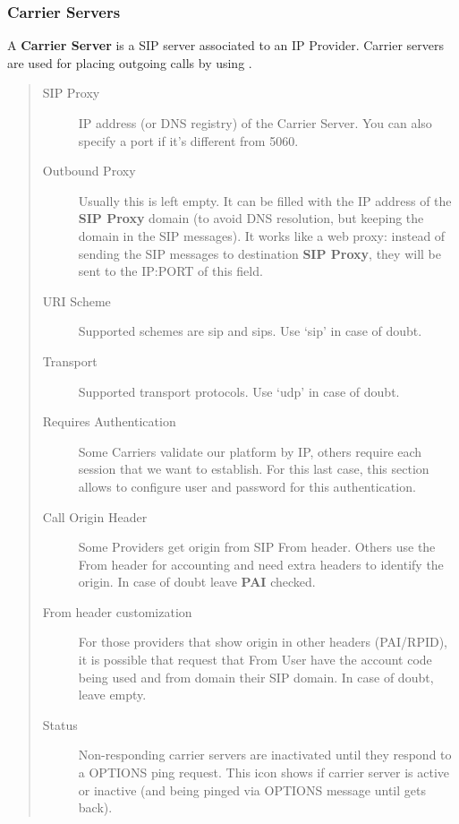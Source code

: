 \documentclass[letterpaper,10pt,english]{sphinxmanual}
\begin{document}
\subsubsection{Carrier Servers}
\label{administration_portal/brand/providers/carriers:carrier-servers}
A \textbf{Carrier Server} is a SIP server associated to an IP Provider. Carrier servers
are used for placing outgoing calls by using {\hyperref[administration_portal/brand/routing/outgoing_routings:outgoing\string-routings]{}}.
\begin{quote}
\begin{description}
\item[{SIP Proxy}] \leavevmode
IP address (or DNS registry) of the Carrier Server. You can also specify
a port if it's different from 5060.

\item[{Outbound Proxy}] \leavevmode
Usually this is left empty. It can be filled with the IP address of the
\textbf{SIP Proxy} domain (to avoid DNS resolution, but keeping the domain
in the SIP messages). It works like a web proxy: instead of sending the
SIP messages to destination \textbf{SIP Proxy}, they will be sent to the
IP:PORT of this field.

\item[{URI Scheme}] \leavevmode
Supported schemes are sip and sips. Use `sip' in case of doubt.

\item[{Transport}] \leavevmode
Supported transport protocols. Use `udp' in case of doubt.

\item[{Requires Authentication}] \leavevmode
Some Carriers validate our platform by IP, others require
each session that we want to establish. For this last case, this section
allows to configure user and password for this authentication.

\item[{Call Origin Header}] \leavevmode
Some Providers get origin from SIP From header. Others use the From
header for accounting and need extra headers to identify the origin.
In case of doubt leave \textbf{PAI} checked.

\item[{From header customization}] \leavevmode
For those providers that show origin in other headers (PAI/RPID), it is
possible that request that From User have the account code being used
and from domain their SIP domain. In case of doubt, leave empty.

\item[{Status}] \leavevmode
Non-responding carrier servers are inactivated until they respond to a OPTIONS ping request. This icon shows
if carrier server is active or inactive (and being pinged via OPTIONS message until gets back).

\end{description}
\end{quote}
\end{document}
